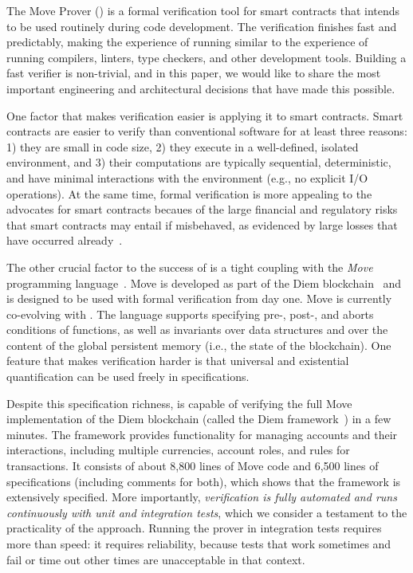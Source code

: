 
The Move Prover (\MVP) is a formal verification tool for smart contracts that
intends to be used routinely during code development.  The verification finishes
fast and predictably, making the experience of running \MVP similar to the
experience of running compilers, linters, type checkers, and other development
tools.  Building a fast verifier is non-trivial, and in this paper, we would
like to share the most important engineering and architectural decisions that
have made this possible.

One factor that makes verification easier is applying it to smart contracts.
Smart contracts are easier to verify than conventional software for at least
three reasons: 1) they are small in code size, 2) they execute in a
well-defined, isolated environment, and 3) their computations are typically
sequential, deterministic, and have minimal interactions with the environment
(e.g., no explicit I/O operations).  At the same time, formal verification is
more appealing to the advocates for smart contracts becaues of the large
financial and regulatory risks that smart contracts may entail if misbehaved, as
evidenced by large losses that have occurred
already~\cite{CONTRACT_VERIFICATION,hacks-on-smart-contracts,hacks-on-compound}.

The other crucial factor to the success of \MVP is a tight coupling with the
\emph{Move} programming language~\cite{MOVE_LANG}.  Move is developed as part of
the Diem blockchain~\cite{DIEM} and is designed to be used with formal
verification from day one.  Move is currently co-evolving with \MVP.  The
language supports specifying pre-, post-, and aborts conditions of functions, as
well as invariants over data structures and over the content of the global
persistent memory (i.e., the state of the blockchain).  One feature that makes
verification harder is that universal and existential quantification can be used
freely in specifications.

Despite this specification richness, \MVP is capable of verifying the full Move
implementation of the Diem blockchain (called the Diem
framework~\cite{DIEM_FRAMEWORK}) in a few minutes.  The framework provides
functionality for managing accounts and their interactions, including multiple
currencies, account roles, and rules for transactions.  It consists of about
8,800 lines of Move code and 6,500 lines of specifications (including comments
for both), which shows that the framework is extensively specified.  More
importantly, \emph{verification is fully automated and runs continuously with
  unit and integration tests}, which we consider a testament to the practicality
of the approach.  Running the prover in integration tests requires more than
speed: it requires reliability, because tests that work sometimes and fail or
time out other times are unacceptable in that context.

